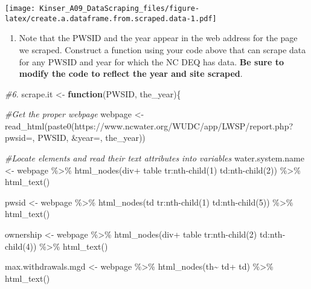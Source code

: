 \documentclass[
]{article}
\newenvironment{Shaded}{\begin{snugshade}}{\end{snugshade}}
\newcommand{\CommentTok}[1]{\textcolor[rgb]{0.56,0.35,0.01}{\textit{#1}}}
\newcommand{\ControlFlowTok}[1]{\textcolor[rgb]{0.13,0.29,0.53}{\textbf{#1}}}
\newcommand{\FunctionTok}[1]{\textcolor[rgb]{0.00,0.00,0.00}{#1}}
\newcommand{\NormalTok}[1]{#1}
\newcommand{\OtherTok}[1]{\textcolor[rgb]{0.56,0.35,0.01}{#1}}
\newcommand{\SpecialCharTok}[1]{\textcolor[rgb]{0.00,0.00,0.00}{#1}}
\newcommand{\StringTok}[1]{\textcolor[rgb]{0.31,0.60,0.02}{#1}}
\providecommand{\tightlist}{%
  \setlength{\itemsep}{0pt}\setlength{\parskip}{0pt}}
\begin{document}
\texttt{[image: Kinser\_A09\_DataScraping\_files/figure-latex/create.a.dataframe.from.scraped.data-1.pdf]}

\begin{enumerate}
\def\labelenumi{\arabic{enumi}.}
\setcounter{enumi}{5}
\tightlist
\item
  Note that the PWSID and the year appear in the web address for the
  page we scraped. Construct a function using your code above that can
  scrape data for any PWSID and year for which the NC DEQ has data.
  \textbf{Be sure to modify the code to reflect the year and site
  scraped}.
\end{enumerate}

\begin{Shaded}
\begin{Highlighting}[]
\CommentTok{\#6.}
\NormalTok{scrape.it }\OtherTok{\textless{}{-}} \ControlFlowTok{function}\NormalTok{(PWSID, the\_year)\{}
  
  \CommentTok{\#Get the proper webpage}
\NormalTok{    webpage }\OtherTok{\textless{}{-}} \FunctionTok{read\_html}\NormalTok{(}\FunctionTok{paste0}\NormalTok{(}\StringTok{\textquotesingle{}https://www.ncwater.org/WUDC/app/LWSP/report.php?pwsid=\textquotesingle{}}\NormalTok{, PWSID, }\StringTok{\textquotesingle{}\&year=\textquotesingle{}}\NormalTok{, the\_year))}
    

  \CommentTok{\#Locate elements and read their text attributes into variables}
\NormalTok{  water.system.name }\OtherTok{\textless{}{-}}\NormalTok{ webpage }\SpecialCharTok{\%\textgreater{}\%} \FunctionTok{html\_nodes}\NormalTok{(}\StringTok{\textquotesingle{}div+ table tr:nth{-}child(1) td:nth{-}child(2)\textquotesingle{}}\NormalTok{) }\SpecialCharTok{\%\textgreater{}\%} \FunctionTok{html\_text}\NormalTok{()}

\NormalTok{  pwsid }\OtherTok{\textless{}{-}}\NormalTok{ webpage }\SpecialCharTok{\%\textgreater{}\%} \FunctionTok{html\_nodes}\NormalTok{(}\StringTok{\textquotesingle{}td tr:nth{-}child(1) td:nth{-}child(5)\textquotesingle{}}\NormalTok{) }\SpecialCharTok{\%\textgreater{}\%} \FunctionTok{html\_text}\NormalTok{()}

\NormalTok{  ownership }\OtherTok{\textless{}{-}}\NormalTok{ webpage }\SpecialCharTok{\%\textgreater{}\%} \FunctionTok{html\_nodes}\NormalTok{(}\StringTok{\textquotesingle{}div+ table tr:nth{-}child(2) td:nth{-}child(4)\textquotesingle{}}\NormalTok{) }\SpecialCharTok{\%\textgreater{}\%} \FunctionTok{html\_text}\NormalTok{()}

\NormalTok{  max.withdrawals.mgd }\OtherTok{\textless{}{-}}\NormalTok{ webpage }\SpecialCharTok{\%\textgreater{}\%} \FunctionTok{html\_nodes}\NormalTok{(}\StringTok{\textquotesingle{}th\textasciitilde{} td+ td\textquotesingle{}}\NormalTok{) }\SpecialCharTok{\%\textgreater{}\%} \FunctionTok{html\_text}\NormalTok{()}


\end{Highlighting}
\end{Shaded}
\end{document}
